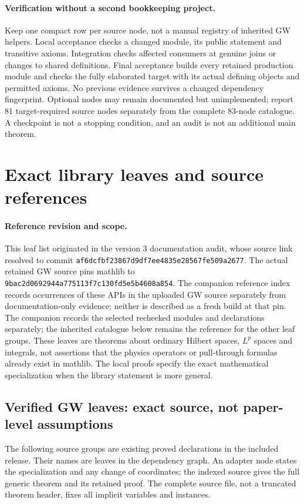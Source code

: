 \documentclass[11pt,a4paper]{article}
\theoremstyle{remark}\newtheorem{remark}[theorem]{Remark}
\begin{document}
\paragraph{Verification without a second bookkeeping project.}
Keep one compact row per source node, not a manual registry of inherited GW helpers. Local acceptance checks a changed module, its public statement and transitive axioms. Integration checks affected consumers at genuine joins or changes to shared definitions. Final acceptance builds every retained production module and checks the fully elaborated target with its actual defining objects and permitted axioms. No previous evidence survives a changed dependency fingerprint. Optional nodes may remain documented but unimplemented; report 81 target-required source nodes separately from the complete 83-node catalogue. A checkpoint is not a stopping condition, and an audit is not an additional main theorem.

\section{Exact library leaves and source references}\label{sec:mathlib}
\paragraph{Reference revision and scope.}
This leaf list originated in the version 3 documentation audit, whose source link resolved to commit
\texttt{af6dcfbf23867d9df7ee4835e28567fe509a2677}. The actual retained GW source pins mathlib to \texttt{9bac2d0692944a775113f7c130fd5e5b4608a854}. The companion reference index records occurrences of these APIs in the uploaded GW source separately from documentation-only evidence; neither is described as a fresh build at that pin. The companion  records the selected rechecked modules and declarations separately; the inherited catalogue below remains the reference for the other leaf groups. These leaves are theorems about ordinary Hilbert spaces, $L^p$ spaces and integrals, not assertions that the physics operators or pull-through formulas already exist in mathlib. The local proofs specify the exact mathematical specialization when the library statement is more general.

\subsection{Verified GW leaves: exact source, not paper-level assumptions}
The following source groups are existing proved declarations in the included release. Their names are leaves in the dependency graph. An adapter node states the specialization and any change of coordinates; the indexed source gives the full generic theorem and its retained proof. The complete source file, not a truncated theorem header, fixes all implicit variables and instances.
\end{document}
